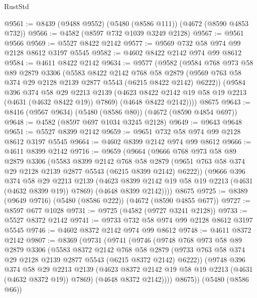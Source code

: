 \begin{lexlean}{RustStd}
\begin{coremodule}
{\begin{coremodule}
{{{{{{{{{{{{{{{{@9561 := @8439 (@9488 @9552) (@5480 (@8586 @111)) (@4672 (@8590 @4853 @732))
@9566 := @4582 (@8597 @732 @1039 @3249 @2128)
@9567 := @9561 @9566
@9569 := @5527 @8422 @2142
@9577 := @9569 @732 @58 @974 @99 @2128 @8612 @3197 @5545
@9582 := @4602 @8422 @2142 @974 @99 @8612
@9584 := @4611 @8422 @2142
@9634 := @9577
    (@9582
      (@9584
        @768
        @973
        @58
        @89
        @2879
        @3306
        (@5583
          @8422
          @2142
          @768
          @58
          @2879
          (@9569 @763 @58 @374 @29 @2128 @2139 @2877 @5543 (@6215 @8422 @2142) @6222))
        (@9584
          @396
          @374
          @58
          @29
          @2213
          @2139
          (@4623 @8422 @2142 @19 @58 @19 @2213 (@4631 (@4632 @8422 @19)) @7869)
          (@4648 @8422 @2142))))
    @8675
@9643 := @8416 (@9567 @9634) (@5480 (@8586 @80)) (@4672 (@8590 @4854 @697))
@9648 := @4582 (@8597 @697 @1034 @3245 @2128)
@9649 := @9643 @9648
@9651 := @5527 @8399 @2142
@9659 := @9651 @732 @58 @974 @99 @2128 @8612 @3197 @5545
@9664 := @4602 @8399 @2142 @974 @99 @8612
@9666 := @4611 @8399 @2142
@9716 := @9659
    (@9664
      (@9666
        @768
        @973
        @58
        @89
        @2879
        @3306
        (@5583
          @8399
          @2142
          @768
          @58
          @2879
          (@9651 @763 @58 @374 @29 @2128 @2139 @2877 @5543 (@6215 @8399 @2142) @6222))
        (@9666
          @396
          @374
          @58
          @29
          @2213
          @2139
          (@4623 @8399 @2142 @19 @58 @19 @2213 (@4631 (@4632 @8399 @19)) @7869)
          (@4648 @8399 @2142))))
    @8675
@9725 := @8389 (@9649 @9716) (@5480 (@8586 @222)) (@4672 (@8590 @4855 @677))
@9727 := @8597 @677 @1028
@9731 := @9725 (@4582 (@9727 @3241 @2128))
@9733 := @5527 @8372 @2142
@9741 := @9733 @732 @58 @974 @99 @2128 @8612 @3197 @5545
@9746 := @4602 @8372 @2142 @974 @99 @8612
@9748 := @4611 @8372 @2142
@9807 := @8369
    (@9731
      (@9741
        (@9746
          (@9748
            @768
            @973
            @58
            @89
            @2879
            @3306
            (@5583
              @8372
              @2142
              @768
              @58
              @2879
              (@9733 @763 @58 @374 @29 @2128 @2139 @2877 @5543 (@6215 @8372 @2142) @6222))
            (@9748
              @396
              @374
              @58
              @29
              @2213
              @2139
              (@4623 @8372 @2142 @19 @58 @19 @2213 (@4631 (@4632 @8372 @19)) @7869)
              (@4648 @8372 @2142))))
        @8675))
    (@5480 (@8586 @66))
}}}}}}}}}}}}}}}}
\end{coremodule}}
\end{coremodule}
\end{lexlean}
